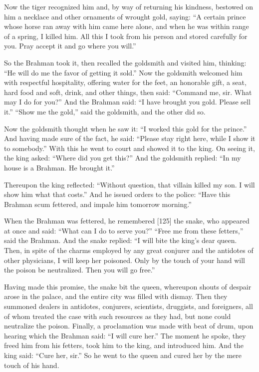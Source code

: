 \documentclass{article}
\begin{document}
Now the tiger recognized him and, by way of returning his kindness,
bestowed on him a necklace and other ornaments of wrought gold,
saying:
``A certain prince whose horse ran away with him came here alone, and when he was within range of a spring, I killed him. All this I took from his person and stored carefully for you. Pray accept it and go where you will.''

So the Brahman took it, then recalled the goldsmith and visited
him, thinking: ``He will do me the favor of getting it sold.'' Now
the goldsmith welcomed him with respectful hospitality, offering
water for the feet, an honorable gift, a seat, hard food and soft,
drink, and other things, then said:
``Command me, sir. What may I do for you?'' And the Brahman said:
``I have brought you gold. Please sell it.'' ``Show me the gold,''
said the goldsmith, and the other did so.

Now the goldsmith thought when he saw it:
``I worked this gold for the prince.'' And having made sure of the
fact, he said:
``Please stay right here, while I show it to somebody.'' With this
he went to court and showed it to the king. On seeing it, the king
asked: ``Where did you get this?'' And the goldsmith replied:
``In my house is a Brahman. He brought it.''

Thereupon the king reflected:
``Without question, that villain killed my son. I will show him what that costs.''
And he issued orders to the police:
``Have this Brahman scum fettered, and impale him tomorrow morning.''

When the Brahman was fettered, he remembered [125] the snake, who
appeared at once and said: ``What can I do to serve you?''
``Free me from these fetters,'' said the Brahman. And the snake
replied:
``I will bite the king's dear queen. Then, in spite of the charms employed by any great conjurer and the antidotes of other physicians, I will keep her poisoned. Only by the touch of your hand will the poison be neutralized. Then you will go free.''

Having made this promise, the snake bit the queen, whereupon shouts
of despair arose in the palace, and the entire city was filled with
dismay. Then they summoned dealers in antidotes, conjurers,
scientists, druggists, and foreigners, all of whom treated the case
with such resources as they had, but none could neutralize the
poison. Finally, a proclamation was made with beat of drum, upon
hearing which the Brahman said: ``I will cure her.'' The moment he
spoke, they freed him from his fetters, took him to the king, and
introduced him. And the king said: ``Cure her, sir.'' So he went to
the queen and cured her by the mere touch of his hand.
\end{document}
